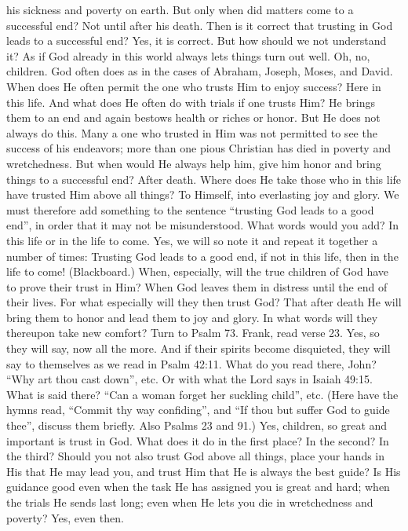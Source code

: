 his sickness and poverty on earth. But only when did matters come to a successful end? Not until after his death. Then is it correct that trusting in God leads to a successful end? Yes, it is correct. But how should we not understand it? As if God already in this world always lets things turn out well. Oh, no, children. God often does as in the cases of Abraham, Joseph, Moses, and David. When does He often permit the one who trusts Him to enjoy success? Here in this life. And what does He often do with trials if one trusts Him? He brings them to an end and again bestows health or riches or honor. But He does not always do this. Many a one who trusted in Him was not permitted to see the success of his endeavors; more than one pious Christian has died in poverty and wretchedness. But when would He always help him, give him honor and bring things to a successful end? After death. Where does He take those who in this life have trusted Him above all things? To Himself, into everlasting joy and glory. We must therefore add something to the sentence “trusting God leads to a good end”, in order that it may not be misunderstood. What words would you add? In this life or in the life to come. Yes, we will so note it and repeat it together a number of times: Trusting God leads to a good end, if not in this life, then in the life to come! (Blackboard.) When, especially, will the true children of God have to prove their trust in Him? When God leaves them in distress until the end of their lives. For what especially will they then trust God? That after death He will bring them to honor and lead them to joy and glory. In what words will they thereupon take new comfort? Turn to Psalm 73. Frank, read verse 23. Yes, so they will say, now all the more. And if their spirits become disquieted, they will say to themselves as we read in Psalm 42:11. What do you read there, John? “Why art thou cast down”, etc. Or with what the Lord says in Isaiah 49:15. What is said there? “Can a woman forget her suckling child”, etc. (Here have the hymns read, “Commit thy way confiding”, and “If thou but suffer God to guide thee”, discuss them briefly. Also Psalms 23 and 91.) Yes, children, so great and important is trust in God. What does it do in the first place? In the second? In the third? Should you not also trust God above all things, place your hands in His that He may lead you, and trust Him that He is always the best guide? Is His guidance good even when the task He has assigned you is great and hard; when the trials He sends last long; even when He lets you die in wretchedness and poverty? Yes, even then.

